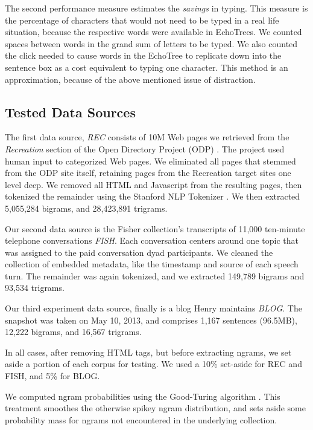 \documentclass{sigchi}
\begin{document}
The second performance measure estimates the {\em savings} in
typing. This measure is the percentage of characters that would not
need to be typed in a real life situation, because the respective
words were available in EchoTrees. We counted spaces between words in
the grand sum of letters to be typed. We also counted the click needed to
cause words in the EchoTree to replicate down into the sentence box as
a cost equivalent to typing one character. This method is an
approximation, because of the above mentioned issue of distraction.

\subsection{Tested Data Sources}

The first data source, {\em REC} consists of 10M Web pages we
retrieved from the {\em Recreation} section of the Open Directory
Project (ODP) \cite{****dmoz***}. The project used human input to
categorized Web pages. We eliminated all pages that stemmed from the
ODP site itself, retaining pages from the Recreation target sites one
level deep. We removed all HTML and Javascript from the resulting
pages, then tokenized the remainder using the Stanford NLP Tokenizer
\cite{****Stanford tokenizer}. We then extracted 5,055,284 bigrams,
and 28,423,891 trigrams.

Our second data source is the Fisher collection's transcripts of
11,000 ten-minute telephone conversations {\em FISH}. Each
conversation centers around one topic that was assigned to the paid
conversation dyad participants. We cleaned the collection of embedded
metadata, like the timestamp and source of each speech turn. The
remainder was again tokenized, and we extracted 149,789 bigrams and
93,534 trigrams.

Our third experiment data source, finally is a blog Henry maintains
{\em BLOG}. The snapshot was taken on May 10, 2013, and comprises
1,167 sentences (96.5MB), 12,222 bigrams, and 16,567 trigrams.

In all cases, after removing HTML tags, but before extracting ngrams,
we set aside a portion of each corpus for testing. We used a 10\%
set-aside for REC and FISH, and 5\% for BLOG.

We computed ngram probabilities using the Good-Turing algorithm
\cite{***good-turing***}. This treatment smoothes the otherwise spikey
ngram distribution, and sets aside some probability mass for ngrams
not encountered in the underlying collection.
\end{document}
